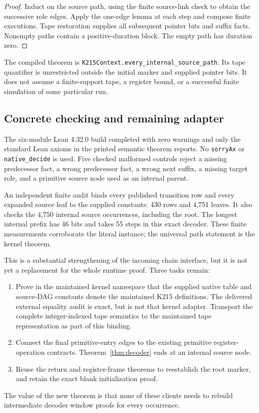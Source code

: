 \documentclass[11pt]{article}
\newcommand{\code}[1]{\texttt{#1}}
\theoremstyle{remark}
\begin{document}
\begin{proof}
Induct on the source path, using the finite source-link check to obtain
the successive role edges. Apply the one-edge lemma at each step and
compose finite executions. Tape restoration supplies all subsequent
pointer bits and suffix facts. Nonempty paths contain a positive-duration
block. The empty path has duration zero.
\end{proof}

The compiled theorem is
\code{K215Context.every\_internal\_source\_path}.
Its tape quantifier is unrestricted outside the initial marker and supplied
pointer bits. It does not assume a finite-support tape, a register bound,
or a successful finite simulation of some particular run.

\subsection{Concrete checking and remaining adapter}

The six-module Lean 4.32.0 build completed with zero warnings and only the
standard Lean axioms in the printed semantic theorem reports.
No \code{sorryAx} or \code{native\_decide} is used. Five checked malformed
controls reject a missing predecessor fact, a wrong predecessor fact, a
wrong next suffix, a missing target role, and a primitive source node used
as an internal parent.

An independent finite audit binds every published transition row and every
expanded source leaf to the supplied constants: 430 rows and 4,751 leaves.
It also checks the 4,750 internal source occurrences, including the root.
The longest internal prefix has 46 bits and takes 55 steps in this exact
decoder. These finite measurements corroborate the literal instance; the
universal path statement is the kernel theorem.

This is a substantial strengthening of the incoming chain interface, but
it is not yet a replacement for the whole runtime proof. Three tasks remain:
\begin{enumerate}
\item Prove in the maintained kernel namespace that the supplied native table
and source-DAG constants denote the maintained K215 definitions.
The delivered external equality audit is exact, but is not that kernel
adapter. Transport the complete integer-indexed tape semantics to the
maintained tape representation as part of this binding.
\item Connect the final primitive-entry edges to the existing primitive
register-operation contracts. Theorem~\ref{thm:decoder} ends at an internal
source node.
\item Reuse the return and register-frame theorems to reestablish the root
marker, and retain the exact blank initialization proof.
\end{enumerate}
The value of the new theorem is that none of these clients needs to rebuild
intermediate decoder window proofs for every occurrence.
\end{document}
